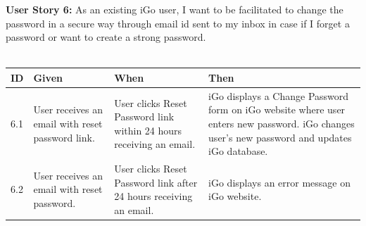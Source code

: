 \documentclass[11pt, english]{report}
\begin{document}
\vspace*{0.2in}
\textbf{User Story 6: }
As an existing iGo user, I want to be facilitated to change the password in a secure way through email id sent to my inbox in case if I forget a password or want to create a strong password.
\\ \\
\setlength{\tabcolsep}{18pt}
\renewcommand{\arraystretch}{1.5}
\begin{tabular}{ |p{0.5cm}|p{3cm}|p{3.5cm}|p{5cm}| }
\hline
\textbf{ID} & \textbf{Given} & \textbf{When} & \textbf{Then}\\
\hline

6.1&
User receives an email with reset password link.&
User clicks Reset Password link within 24 hours receiving an email.&
iGo displays a Change Password form on iGo website where user enters new password.
iGo changes user’s new password and updates iGo database.
 \\
\hline

6.2&
User receives an email with reset password.&
User clicks Reset Password link after 24 hours receiving an email.&
iGo displays an error message on iGo website.
 \\
\hline
\end{tabular}
\vspace*{0.2in}
\end{document}
